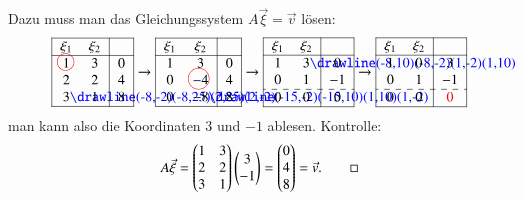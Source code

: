 \begin{beispiel}
Dazu muss man das Gleichungssystem $A\vec{\xi}=\vec{v}$ lösen:
\[
\begin{tabular}{|>{$}c<{$}>{$}c<{$}|>{$}c<{$}|}
\hline
\xi_1&\xi_2&\\
\hline
1%
\begin{picture}(0,0)
\color{red}\put(-3,4){\circle{12}}
\end{picture}%
&3&0\\
2&2&4\\
3%
\begin{picture}(0,0)
\color{blue}\drawline(-8,-2)(-8,25)(2,25)(2,-2)
\end{picture}%
&1&8\\
\hline
\end{tabular}
\rightarrow
\begin{tabular}{|>{$}c<{$}>{$}c<{$}|>{$}c<{$}|}
\hline
\xi_1&\xi_2&\\
\hline
1&3&0\\
0&-4%
\begin{picture}(0,0)
\color{red}\put(-7,4){\circle{15}}
\end{picture}%
&4\\
0&-8%
\begin{picture}(0,0)
\color{blue}\drawline(-15,-2)(-15,10)(1,10)(1,-2)
\end{picture}%
&8\\
\hline
\end{tabular}
\rightarrow
\begin{tabular}{|>{$}c<{$}>{$}c<{$}|>{$}c<{$}|}
\hline
\xi_1&\xi_2&\\
\hline
1&3%
\begin{picture}(0,0)
\color{blue}\drawline(-8,10)(-8,-2)(1,-2)(1,10)
\end{picture}%
&0\\
0&1&-1\\
\hdashline
0&0&0\\
\hline
\end{tabular}
\rightarrow
\begin{tabular}{|>{$}c<{$}>{$}c<{$}|>{$}c<{$}|}
\hline
\xi_1&\xi_2&\\
\hline
1&0&3\\
0&1&-1\\
\hdashline
0&0&\color{red}0\\
\hline
\end{tabular}
\]
man kann also die Koordinaten $3$ und $-1$ ablesen.
Kontrolle:
\[
A\vec{\xi}
=
\begin{pmatrix}
1&3\\
2&2\\
3&1\end{pmatrix}
\begin{pmatrix}3\\-1\end{pmatrix}
=\begin{pmatrix}
0\\4\\8
\end{pmatrix}
=\vec{v}.
\qedhere
\]
\end{beispiel}

